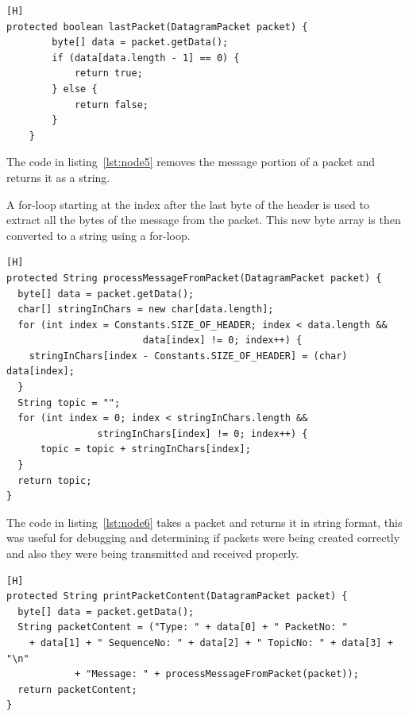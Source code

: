 \documentclass{article}
\begin{document}
\begin{lstlisting}[caption={[Sample Code 2]Determines if a packet is the last packet of a transmission}, label={lst:node4}][H]
protected boolean lastPacket(DatagramPacket packet) {
		byte[] data = packet.getData();
		if (data[data.length - 1] == 0) {
			return true;
		} else {
			return false;
		}
	}
\end{lstlisting}


The code in listing~\ref{lst:node5} removes the message portion of a packet and returns it as a string.

A for-loop starting at the index after the last byte of the header is used to extract all the bytes of the message from the packet. This new byte array is then converted to a string using a for-loop.

\begin{lstlisting}[caption={[Sample Code 2]Removes the message portion of a packet and returns it as a string.}, label={lst:node5}][H]
protected String processMessageFromPacket(DatagramPacket packet) {
  byte[] data = packet.getData();
  char[] stringInChars = new char[data.length];
  for (int index = Constants.SIZE_OF_HEADER; index < data.length && 
						data[index] != 0; index++) {
	stringInChars[index - Constants.SIZE_OF_HEADER] = (char) data[index];
  }
  String topic = "";
  for (int index = 0; index < stringInChars.length && 
				stringInChars[index] != 0; index++) {
	  topic = topic + stringInChars[index];
  }
  return topic;
}
\end{lstlisting}


The code in listing~\ref{lst:node6} takes a packet and returns it in string format, this was useful for debugging and determining if packets were being created correctly and also they were being transmitted and received properly.

\begin{lstlisting}[caption={[Sample Code 2]String representation of a packet}, label={lst:node6}][H]
protected String printPacketContent(DatagramPacket packet) {
  byte[] data = packet.getData();
  String packetContent = ("Type: " + data[0] + " PacketNo: " 
	+ data[1] + " SequenceNo: " + data[2] + " TopicNo: " + data[3] + "\n"
			+ "Message: " + processMessageFromPacket(packet));
  return packetContent;
}
\end{lstlisting}
\end{document}
